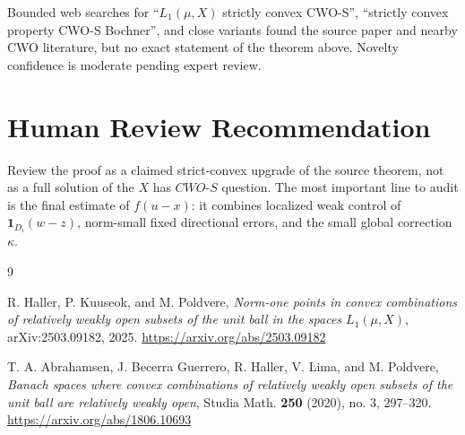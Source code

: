 \documentclass[11pt]{article}
\newcommand{\CWOS}{\textit{CWO-S}}
\newcommand{\one}{\mathbf 1}
\begin{document}
Bounded web searches for ``\(L_1(\mu,X)\) strictly convex CWO-S'', ``strictly
convex property CWO-S Bochner'', and close variants found the source paper and
nearby CWO literature, but no exact statement of the theorem above.  Novelty
confidence is moderate pending expert review.

\section*{Human Review Recommendation}

Review the proof as a claimed strict-convex upgrade of the source theorem, not
as a full solution of the \(X\) has \(\CWOS\) question.  The most important
line to audit is the final estimate of \(f(u-x)\): it combines localized weak
control of \(\one_{D_i}(w-z)\), norm-small fixed directional errors, and the
small global correction \(\kappa\).

\begin{thebibliography}{9}

R. Haller, P. Kuuseok, and M. Poldvere,
\emph{Norm-one points in convex combinations of relatively weakly open subsets
of the unit ball in the spaces \(L_1(\mu,X)\)},
arXiv:2503.09182, 2025.
\url{https://arxiv.org/abs/2503.09182}

T. A. Abrahamsen, J. Becerra Guerrero, R. Haller, V. Lima, and M. Poldvere,
\emph{Banach spaces where convex combinations of relatively weakly open
subsets of the unit ball are relatively weakly open},
Studia Math. \textbf{250} (2020), no. 3, 297--320.
\url{https://arxiv.org/abs/1806.10693}

\end{thebibliography}
\end{document}
